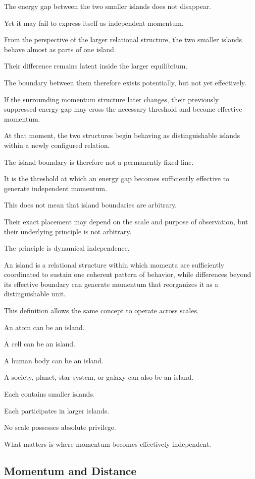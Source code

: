 The energy gap between the two smaller islands does not disappear.

Yet it may fail to express itself as independent momentum.

From the perspective of the larger relational structure, the two smaller islands behave almost as parts of one island.

Their difference remains latent inside the larger equilibrium.

The boundary between them therefore exists potentially, but not yet effectively.

If the surrounding momentum structure later changes, their previously suppressed energy gap may cross the necessary threshold and become effective momentum.

At that moment, the two structures begin behaving as distinguishable islands within a newly configured relation.

The island boundary is therefore not a permanently fixed line.

It is the threshold at which an energy gap becomes sufficiently effective to generate independent momentum.

This does not mean that island boundaries are arbitrary.

Their exact placement may depend on the scale and purpose of observation, but their underlying principle is not arbitrary.

The principle is dynamical independence.

An island is a relational structure within which momenta are sufficiently coordinated to sustain one coherent pattern of behavior, while differences beyond its effective boundary can generate momentum that reorganizes it as a distinguishable unit.

This definition allows the same concept to operate across scales.

An atom can be an island.

A cell can be an island.

A human body can be an island.

A society, planet, star system, or galaxy can also be an island.

Each contains smaller islands.

Each participates in larger islands.

No scale possesses absolute privilege.

What matters is where momentum becomes effectively independent.

\subsection*{\textbf{Momentum and Distance}}

